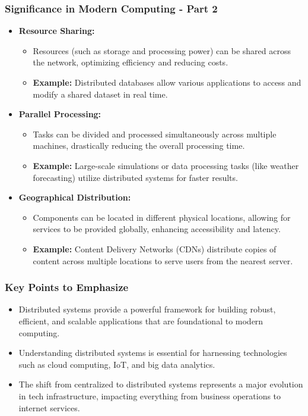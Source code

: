 \documentclass[aspectratio=169]{beamer}
\begin{document}
\begin{frame}[fragile]
    \frametitle{Significance in Modern Computing - Part 2}
    \begin{itemize}
        \item \textbf{Resource Sharing:}
        \begin{itemize}
            \item Resources (such as storage and processing power) can be shared across the network, optimizing efficiency and reducing costs.
            \item \textbf{Example:} Distributed databases allow various applications to access and modify a shared dataset in real time.
        \end{itemize}
        
        \item \textbf{Parallel Processing:}
        \begin{itemize}
            \item Tasks can be divided and processed simultaneously across multiple machines, drastically reducing the overall processing time.
            \item \textbf{Example:} Large-scale simulations or data processing tasks (like weather forecasting) utilize distributed systems for faster results.
        \end{itemize}
        
        \item \textbf{Geographical Distribution:}
        \begin{itemize}
            \item Components can be located in different physical locations, allowing for services to be provided globally, enhancing accessibility and latency.
            \item \textbf{Example:} Content Delivery Networks (CDNs) distribute copies of content across multiple locations to serve users from the nearest server.
        \end{itemize}
    \end{itemize}
\end{frame}

\begin{frame}[fragile]
    \frametitle{Key Points to Emphasize}
    \begin{itemize}
        \item Distributed systems provide a powerful framework for building robust, efficient, and scalable applications that are foundational to modern computing.
        \item Understanding distributed systems is essential for harnessing technologies such as cloud computing, IoT, and big data analytics.
        \item The shift from centralized to distributed systems represents a major evolution in tech infrastructure, impacting everything from business operations to internet services.
    \end{itemize}
\end{frame}
\end{document}
